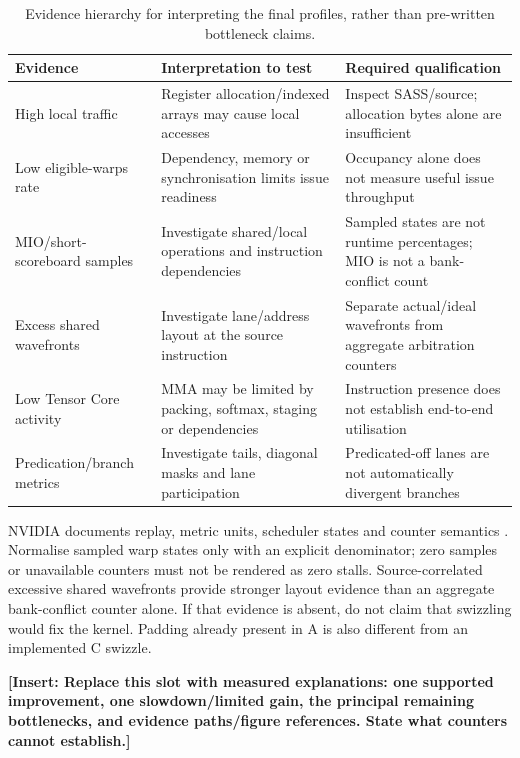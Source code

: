 \documentclass[11pt,a4paper]{article}
\newcommand{\pending}[1]{\textcolor{draftblue}{\textbf{[Insert: #1]}}}
\begin{document}
\begin{table}[tbp]\centering\small
\begin{tabularx}{\linewidth}{@{}lYY@{}}\toprule
Evidence & Interpretation to test & Required qualification\\\midrule
High local traffic & Register allocation/indexed arrays may cause local accesses & Inspect SASS/source; allocation bytes alone are insufficient\\
Low eligible-warps rate & Dependency, memory or synchronisation limits issue readiness & Occupancy alone does not measure useful issue throughput\\
MIO/short-scoreboard samples & Investigate shared/local operations and instruction dependencies & Sampled states are not runtime percentages; MIO is not a bank-conflict count\\
Excess shared wavefronts & Investigate lane/address layout at the source instruction & Separate actual/ideal wavefronts from aggregate arbitration counters\\
Low Tensor Core activity & MMA may be limited by packing, softmax, staging or dependencies & Instruction presence does not establish end-to-end utilisation\\
Predication/branch metrics & Investigate tails, diagonal masks and lane participation & Predicated-off lanes are not automatically divergent branches\\
\bottomrule\end{tabularx}
\caption{Evidence hierarchy for interpreting the final profiles, rather than pre-written bottleneck claims.}\label{tab:profiling}
\end{table}

NVIDIA documents replay, metric units, scheduler states and counter semantics
\cite{nsight}. Normalise sampled warp states only with an explicit denominator;
zero samples or unavailable counters must not be rendered as zero stalls.
Source-correlated excessive shared wavefronts provide stronger layout evidence
than an aggregate bank-conflict counter alone. If that evidence is absent, do
not claim that swizzling would fix the kernel. Padding already present in A is
also different from an implemented C swizzle.

\pending{Replace this slot with measured explanations: one supported improvement,
one slowdown/limited gain, the principal remaining bottlenecks, and evidence
paths/figure references. State what counters cannot establish.}
\end{document}
